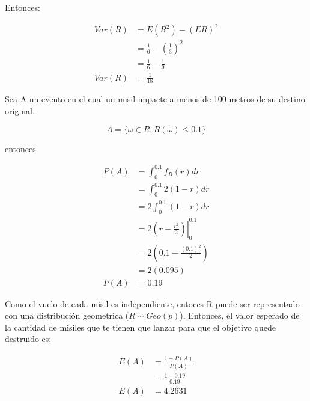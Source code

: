 Entonces:

\begin{align*}
    Var(R) & = E(R^2) -(ER)^2                           \\
           & = \frac{1}{6} - \left(\frac{1}{3}\right)^2 \\
           & = \frac{1}{6} - \frac{1}{9}                \\
    Var(R) & = \frac{1}{18}
\end{align*}

Sea A un evento en el cual un misil impacte a menos de 100 metros de su destino original.

\begin{equation*}
    A = \{ \omega \in R: R(\omega)\leq 0.1 \}
\end{equation*}

entonces

\begin{align*}
    P(A) & = \int_0^{0.1} f_R(r) dr                               \\
         & = \int_0^{0.1} 2(1-r) dr                               \\
         & = 2 \int_0^{0.1} (1-r) dr                              \\
         & = 2  \left.\left(r-\frac{r^2}{2}\right)\right|_0^{0.1} \\
         & = 2 \left(0.1-\frac{(0.1)^2}{2}\right)                 \\
         & = 2 (0.095)                                            \\
    P(A) & = 0.19
\end{align*}

Como el vuelo de cada misil es independiente, entoces R puede ser representado con una distribución geometrica ($R\sim Geo(p)$). Entonces, el valor esperado de  la cantidad de misiles que te tienen que lanzar para que el objetivo quede destruido es:

\begin{align*}
    E(A) & = \frac{1-P(A)}{P(A)} \\
         & = \frac{1-0.19}{0.19} \\
    E(A) & = 4.2631
\end{align*}